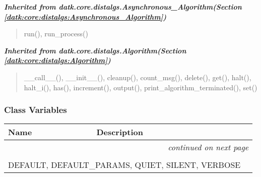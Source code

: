 \large{\textbf{\textit{Inherited from datk.core.distalgs.Asynchronous\_Algorithm\textit{(Section \ref{datk:core:distalgs:Asynchronous_Algorithm})}}}}

\begin{quote}
run(), run\_process()
\end{quote}

\large{\textbf{\textit{Inherited from datk.core.distalgs.Algorithm\textit{(Section \ref{datk:core:distalgs:Algorithm})}}}}

\begin{quote}
\_\_call\_\_(), \_\_init\_\_(), cleanup(), count\_msg(), delete(), get(), halt(), halt\_i(), has(), increment(), output(), print\_algorithm\_terminated(), set()
\end{quote}


  \subsubsection{Class Variables}

    \vspace{-1cm}
\hspace{\varindent}\begin{longtable}{|p{\varnamewidth}|p{\vardescrwidth}|l}
\cline{1-2}
\cline{1-2} \centering \textbf{Name} & \centering \textbf{Description}& \\
\cline{1-2}
\endhead\cline{1-2}\multicolumn{3}{r}{\small\textit{continued on next page}}\\\endfoot\cline{1-2}
\endlastfoot\multicolumn{2}{|l|}{\textit{Inherited from datk.core.distalgs.Algorithm \textit{(Section \ref{datk:core:distalgs:Algorithm})}}}\\
\multicolumn{2}{|p{\varwidth}|}{\raggedright DEFAULT, DEFAULT\_PARAMS, QUIET, SILENT, VERBOSE}\\
\cline{1-2}
\end{longtable}



